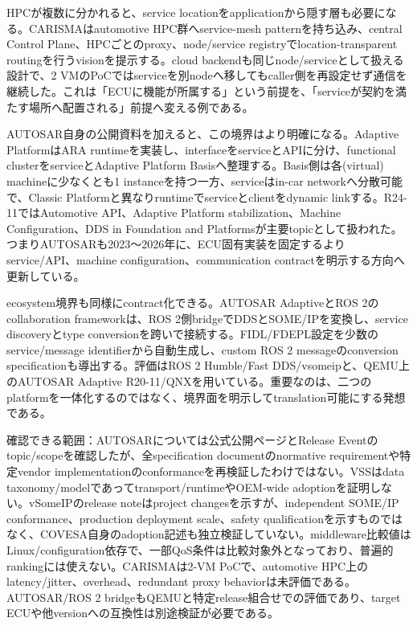 \begin{surveyarticlebody}
HPCが複数に分かれると、service locationをapplicationから隠す層も必要になる。CARISMAはautomotive HPC群へservice-mesh patternを持ち込み、central Control Plane、HPCごとのproxy、node/service registryでlocation-transparent routingを行うvisionを提示する。cloud backendも同じnode/serviceとして扱える設計で、2 VMのPoCではserviceを別nodeへ移してもcaller側を再設定せず通信を継続した。これは「ECUに機能が所属する」という前提を、「serviceが契約を満たす場所へ配置される」前提へ変える例である。\autocite{src-e48bb52ed24d}

AUTOSAR自身の公開資料を加えると、この境界はより明確になる。Adaptive PlatformはARA runtimeを実装し、interfaceをserviceとAPIに分け、functional clusterをserviceとAdaptive Platform Basisへ整理する。Basis側は各(virtual) machineに少なくとも1 instanceを持つ一方、serviceはin-car networkへ分散可能で、Classic Platformと異なりruntimeでserviceとclientをdynamic linkする。R24-11ではAutomotive API、Adaptive Platform stabilization、Machine Configuration、DDS in Foundation and Platformsが主要topicとして扱われた。つまりAUTOSARも2023〜2026年に、ECU固有実装を固定するよりservice/API、machine configuration、communication contractを明示する方向へ更新している。\autocite{src-f65f7dca2182,src-7d08f22a7fd1}

ecosystem境界も同様にcontract化できる。AUTOSAR AdaptiveとROS 2のcollaboration frameworkは、ROS 2側bridgeでDDSとSOME/IPを変換し、service discoveryとtype conversionを跨いで接続する。FIDL/FDEPL設定を少数のservice/message identifierから自動生成し、custom ROS 2 messageのconversion specificationも導出する。評価はROS 2 Humble/Fast DDS/vsomeipと、QEMU上のAUTOSAR Adaptive R20-11/QNXを用いている。重要なのは、二つのplatformを一体化するのではなく、境界面を明示してtranslation可能にする発想である。\autocite{src-6eaa57440b57}
\end{surveyarticlebody}

\begin{claimboundary}
確認できる範囲：AUTOSARについては公式公開ページとRelease Eventのtopic/scopeを確認したが、全specification documentのnormative requirementや特定vendor implementationのconformanceを再検証したわけではない。VSSはdata taxonomy/modelであってtransport/runtimeやOEM-wide adoptionを証明しない。vSomeIPのrelease noteはproject changesを示すが、independent SOME/IP conformance、production deployment scale、safety qualificationを示すものではなく、COVESA自身のadoption記述も独立検証していない。middleware比較値はLinux/configuration依存で、一部QoS条件は比較対象外となっており、普遍的rankingには使えない。CARISMAは2-VM PoCで、automotive HPC上のlatency/jitter、overhead、redundant proxy behaviorは未評価である。AUTOSAR/ROS 2 bridgeもQEMUと特定release組合せでの評価であり、target ECUや他versionへの互換性は別途検証が必要である。\autocite{src-1486b9718088,src-3679b299f3f3,src-3ce752187789,src-6e8a6e979101,src-6eaa57440b57,src-879373aaf497,src-971a21882f71,src-99e7f06f7d63,src-c89d0f167c6b,src-ca972b7a2898,src-db0527589c91,src-ddf9eb5e9b75,src-e24ad9438abe,src-e48bb52ed24d,src-f81981d5bb3b}
\end{claimboundary}
